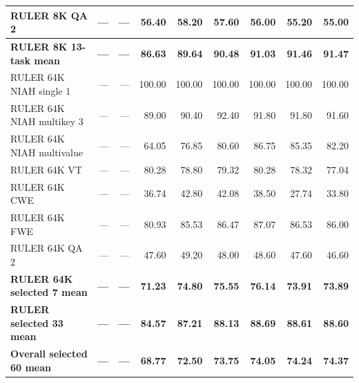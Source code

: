 \begin{longtable}{@{}lrrrrrrrr@{}}
RULER 8K QA 2 & --- & --- & 56.40 & 58.20 & 57.60 & 56.00 & 55.20 & 55.00 \\
\hline
\textbf{RULER 8K 13-task mean} & \textbf{---} & \textbf{---} & \textbf{86.63} & \textbf{89.64} & \textbf{90.48} & \textbf{91.03} & \textbf{91.46} & \textbf{91.47} \\
\hline
RULER 64K NIAH single 1 & --- & --- & 100.00 & 100.00 & 100.00 & 100.00 & 100.00 & 100.00 \\
RULER 64K NIAH multikey 3 & --- & --- & 89.00 & 90.40 & 92.40 & 91.80 & 91.80 & 91.60 \\
RULER 64K NIAH multivalue & --- & --- & 64.05 & 76.85 & 80.60 & 86.75 & 85.35 & 82.20 \\
RULER 64K VT & --- & --- & 80.28 & 78.80 & 79.32 & 80.28 & 78.32 & 77.04 \\
RULER 64K CWE & --- & --- & 36.74 & 42.80 & 42.08 & 38.50 & 27.74 & 33.80 \\
RULER 64K FWE & --- & --- & 80.93 & 85.53 & 86.47 & 87.07 & 86.53 & 86.00 \\
RULER 64K QA 2 & --- & --- & 47.60 & 49.20 & 48.00 & 48.60 & 47.60 & 46.60 \\
\hline
\textbf{RULER 64K selected 7 mean} & \textbf{---} & \textbf{---} & \textbf{71.23} & \textbf{74.80} & \textbf{75.55} & \textbf{76.14} & \textbf{73.91} & \textbf{73.89} \\
\hline
\hline
\textbf{RULER selected 33 mean} & \textbf{---} & \textbf{---} & \textbf{84.57} & \textbf{87.21} & \textbf{88.13} & \textbf{88.69} & \textbf{88.61} & \textbf{88.60} \\
\hline
\hline
\textbf{Overall selected 60 mean} & \textbf{---} & \textbf{---} & \textbf{68.77} & \textbf{72.50} & \textbf{73.75} & \textbf{74.05} & \textbf{74.24} & \textbf{74.37} \\
\hline
\end{longtable}
\endgroup
\clearpage

